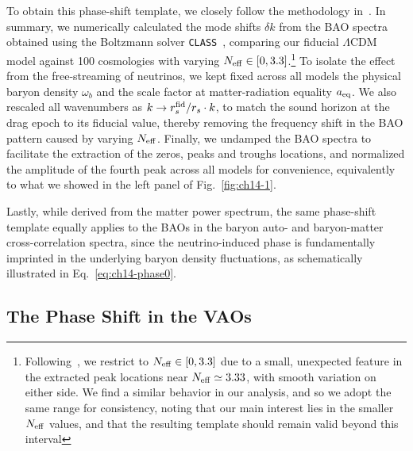 To obtain this phase-shift template, we closely follow the methodology in~\cite{Baumann:2017gkg}. In summary, we numerically calculated the mode shifts $\delta k$ from the BAO spectra obtained using the Boltzmann solver \texttt{CLASS}~\cite{Blas:2011rf}, comparing our fiducial $\Lambda$CDM model against 100 cosmologies with varying  $N_{\rm eff} \in [0, 3.3]$.\footnote{Following~\cite{Baumann:2017gkg,Baumann:2019keh}, we restrict to $N_{\rm eff} \in [0,3.3]$ due to a small, unexpected feature in the extracted peak locations near $N_{\rm eff} \simeq 3.33$, with smooth variation on either side. We find a similar behavior in our analysis, and so we adopt the same range for consistency, noting that our main interest lies in the smaller $N_{\rm eff}$ values, and that the resulting template should remain valid beyond this interval} To isolate the effect from the free-streaming of neutrinos, we kept fixed across all models the physical baryon density $\omega_b$ and the scale factor at matter-radiation
equality $a_{\rm eq}$. We also rescaled all wavenumbers as $k \to r_s^{\rm fid}/r_s \cdot k$, to match the sound horizon at the drag epoch to its fiducial value, thereby removing the frequency shift in the BAO pattern caused by varying $N_{\rm eff}$. Finally, we undamped the BAO spectra to facilitate the extraction of the zeros, peaks and troughs locations, and normalized the amplitude of the fourth peak across all models for convenience,  equivalently to
what we showed in the left panel of Fig.~\ref{fig:ch14-1}.

Lastly, while derived from the matter power spectrum, the same phase-shift template equally applies to the BAOs in the baryon auto- and baryon-matter cross-correlation spectra, since the neutrino-induced phase is fundamentally imprinted in the underlying baryon density fluctuations, as schematically illustrated in Eq.~\eqref{eq:ch14-phase0}.
\subsection{The Phase Shift in the VAOs}\label{sec:ch14-phase_vao}



